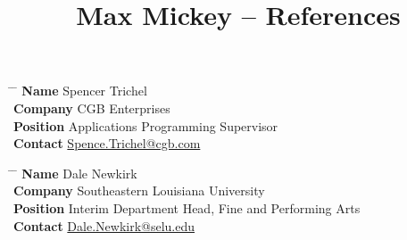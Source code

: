 \documentclass[10pt]{article} %
\begin{document}
\title{Max Mickey -- References} %


\parbox{0.5\textwidth}{ %
\begin{tabbing}
\hspace{2.75cm} \= \hspace{4cm} \= \kill %
{\bf Name} \> Spencer Trichel \\ %
{\bf Company} \> CGB Enterprises \\ %
{\bf Position} \> Applications Programming Supervisor \\ %
{\bf Contact} \> \href{mailto:Spence.Trichel@cgb.com}{Spence.Trichel@cgb.com} %
\end{tabbing}}

\parbox{0.5\textwidth}{ %
\begin{tabbing}
\hspace{2.75cm} \= \hspace{4cm} \= \kill %
{\bf Name} \> Dale Newkirk \\ %
{\bf Company} \> Southeastern Louisiana University \\ %
{\bf Position} \> Interim Department Head, Fine and Performing Arts \\ %
{\bf Contact} \> \href{mailto:Dale.Newkirk@selu.edu}{Dale.Newkirk@selu.edu} %
\end{tabbing}}

\end{document}
